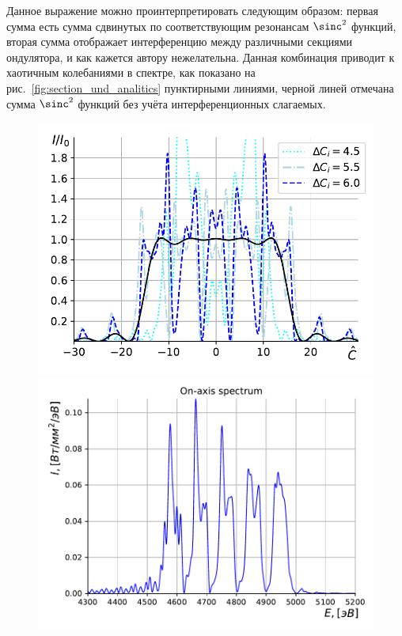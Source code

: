 Данное выражение можно проинтерпретировать следующим образом: первая сумма есть сумма сдвинутых по соответствующим резонансам $\sinc^2$ функций, вторая сумма отображает интерференцию между различными секциями ондулятора, и как кажется автору нежелательна. Данная комбинация приводит к хаотичным колебаниями в спектре, как показано на рис.~\ref{fig:section_und_analitics} пунктирными линиями, черной линей отмечана сумма $\sinc^2$ функций без учёта интерференционных слагаемых.
\begin{figure}
	\centering  
	\begin{minipage}{0.49\textwidth}
		\centering
		\includegraphics[width=\textwidth]{pic/spec_from_sec_und.pdf}
		\caption{}
		\label{fig:section_und_analitics}
	\end{minipage}\hfill
	\begin{minipage}{0.49\textwidth}
		\centering
		\includegraphics[width=\textwidth]{pic/sim_und_spec.pdf}
		\caption{}
		\label{fig:section_und_SRW}
	\end{minipage}    
\end{figure}

